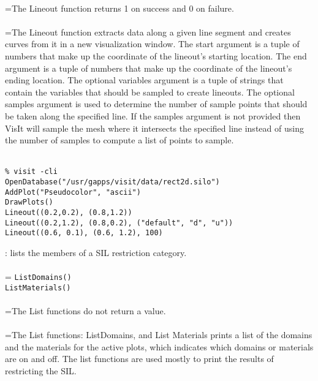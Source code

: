 \documentclass[10pt,a4paper]{report}
\begin{document}
 \\ 
\hangindent=\parindent The Lineout function returns 1 on success and 0 on failure. \\[-3mm] 

 \\ 
\hangindent=\parindent The Lineout function extracts data along a given line segment and creates curves from it in a new visualization window. The start argument is a tuple of numbers that make up the coordinate of the lineout's starting location. The end argument is a tuple of numbers that make up the coordinate of the lineout's ending location. The optional variables argument is a tuple of strings that contain the variables that should be sampled to create lineouts. The optional samples argument is used to determine the number of sample points that should be taken along the specified line. If the samples argument is not provided then VisIt will sample the mesh where it intersects the specified line instead of using the number of samples to compute a list of points to sample. \\[-3mm] 

\\[-6mm]
\begin{verbatim}% visit -cli
OpenDatabase("/usr/gapps/visit/data/rect2d.silo")
AddPlot("Pseudocolor", "ascii")
DrawPlots()
Lineout((0.2,0.2), (0.8,1.2))
Lineout((0.2,1.2), (0.8,0.2), ("default", "d", "u"))
Lineout((0.6, 0.1), (0.6, 1.2), 100)
\end{verbatim}
\newpage


{}
: lists the members of a SIL restriction category.\\[-3mm]

 \\ 
\hangindent=\parindent 
\verb!ListDomains()!\\ 
\verb!ListMaterials()!\\ [-3mm]

 \\ 
\hangindent=\parindent The List functions do not return a value. \\[-3mm] 

 \\ 
\hangindent=\parindent The List functions: ListDomains, and List Materials prints a list of the domains and the materials for the active plots, which indicates which domains or materials are on and off. The list functions are used mostly to print the results of restricting the SIL. \\[-3mm] 
\end{document}
